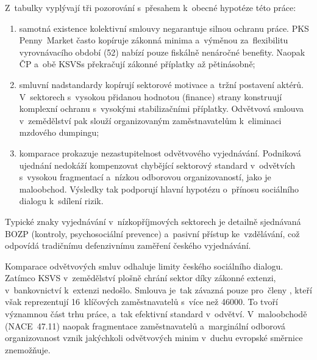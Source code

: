 Z~tabulky vyplývají tři pozorování s~přesahem k~obecné hypotéze této práce:
\begin{enumerate}
  \item samotná existence kolektivní smlouvy negarantuje silnou ochranu práce. \Acf{PKS} Penny~Market často kopíruje zákonná minima a~výměnou za~flexibilitu vyrovnávacího období (\SI{52}{\week}) nabízí pouze fiskálně nenáročné benefity. Naopak \ac{ČP} a~obě \acp{KSVS} překračují zákonné příplatky až pětinásobně;
  \item smluvní nadstandardy kopírují sektorové motivace a~tržní postavení aktérů. V~sektorech s~vysokou přidanou hodnotou (finance) strany konstruují komplexní ochranu s~vysokými stabilizačními příplatky. Odvětvová smlouva v~zemědělství pak slouží organizovaným zaměstnavatelům k~eliminaci mzdového dumpingu;
  \item komparace prokazuje nezastupitelnost odvětvového vyjednávání. Podniková ujednání nedokáží kompenzovat chybějící sektorový standard v~odvětvích s~vysokou fragmentací a~nízkou odborovou organizovaností, jako je maloobchod. Výsledky tak podporují hlavní hypotézu o~přínosu sociálního dialogu k~sdílení rizik.
\end{enumerate}\par

Typické znaky vyjednávání v~nízkopříjmových sektorech je detailně sjednávaná \acs{BOZP} (kontroly, psychosociální prevence) a~pasivní přístup ke~vzdělávání, což odpovídá tradičnímu defenzivnímu zaměření českého vyjednávání.~\cite{Eurofound_CBBeyondPay_2024}\par

Komparace odvětvových smluv odhaluje limity českého sociálního dialogu. Zatímco \ac{KSVS} v~zemědělství plošně chrání sektor díky zákonné extenzi, v~bankovnictví k~extenzi nedošlo. Smlouva je~tak závazná pouze pro~členy , kteří však reprezentují \num{16}~klíčových zaměstnavatelů s~více než \SI{46000}{\person}. To tvoří významnou část trhu práce, a~tak efektivní standard v~odvětví. V~maloobchodě (\ac{NACE}~47.11) naopak fragmentace zaměstnavatelů a~marginální odborová organizovanost vznik jakýchkoli odvětvových minim v~duchu evropské směrnice znemožňuje.~\cite{eu_directive_2022_2041}~\cite{CMKOS_ZpravaKV2025}\par
